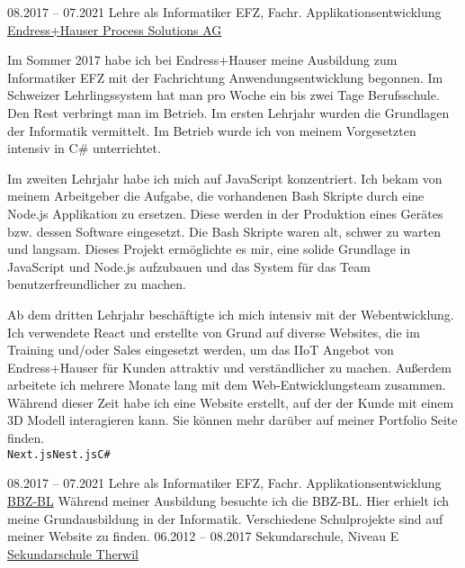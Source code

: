\documentclass[9pt]{developercv} %
\begin{document}

\begin{entrylist}
	\entry
		{08.2017 -- 07.2021}
		{Lehre als Informatiker EFZ, Fachr. Applikationsentwicklung}
		{\href{https://endress.com}{Endress+Hauser Process Solutions AG}}
		{Im Sommer 2017 habe ich bei Endress+Hauser meine Ausbildung zum Informatiker EFZ mit der Fachrichtung Anwendungsentwicklung begonnen. Im Schweizer Lehrlingssystem hat man pro Woche ein bis zwei Tage Berufsschule. Den Rest verbringt man im Betrieb. Im ersten Lehrjahr wurden die Grundlagen der Informatik vermittelt. Im Betrieb wurde ich von meinem Vorgesetzten intensiv in C\# unterrichtet.

    Im zweiten Lehrjahr habe ich mich auf JavaScript konzentriert. Ich bekam von meinem Arbeitgeber die Aufgabe, die vorhandenen Bash Skripte durch eine Node.js Applikation zu ersetzen. Diese werden in der Produktion eines Gerätes bzw. dessen Software eingesetzt. Die Bash Skripte waren alt, schwer zu warten und langsam. Dieses Projekt ermöglichte es mir, eine solide Grundlage in JavaScript und Node.js aufzubauen und das System für das Team benutzerfreundlicher zu machen.
    
    Ab dem dritten Lehrjahr beschäftigte ich mich intensiv mit der Webentwicklung. Ich verwendete React und erstellte von Grund auf diverse Websites, die im Training und/oder Sales eingesetzt werden, um das IIoT Angebot von Endress+Hauser für Kunden attraktiv und verständlicher zu machen. Außerdem arbeitete ich mehrere Monate lang mit dem Web-Entwicklungsteam zusammen. Während dieser Zeit habe ich eine Website erstellt, auf der der Kunde mit einem 3D Modell interagieren kann. Sie können mehr darüber auf meiner Portfolio Seite finden.\\ \texttt{Next.js}\slashsep\texttt{Nest.js}\slashsep\texttt{C\#}}
\end{entrylist}



\begin{entrylist}
	\entry
		{08.2017 -- 07.2021}
		{Lehre als Informatiker EFZ, Fachr. Applikationsentwicklung}
		{\href{https://www.bbzbl.ch/}{BBZ-BL}}
		{Während meiner Ausbildung besuchte ich die BBZ-BL. Hier erhielt ich meine Grundausbildung in der Informatik. Verschiedene Schulprojekte sind auf meiner Website zu finden.}
	\entry
		{06.2012 -- 08.2017}
		{Sekundarschule, Niveau E}
		{\href{https://www.sektherwil.ch/}{Sekundarschule Therwil}}
		{}
\end{entrylist}
\end{document}
